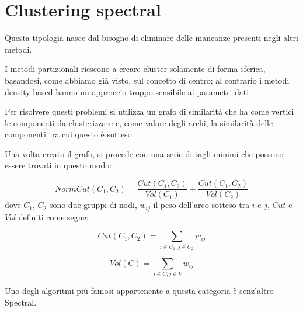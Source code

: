 \section{Clustering spectral}
	Questa tipologia nasce dal bisogno di eliminare delle mancanze presenti negli altri metodi. 

	I metodi partizionali riescono a creare cluster solamente di forma sferica, basandosi, come abbiamo già visto, sul concetto di centro; al contrario i metodi density-based hanno un approccio troppo sensibile ai parametri dati.

	Per risolvere questi problemi si utilizza un grafo di similarità che ha come vertici le componenti da clusterizzare e, come valore degli archi, la similarità delle componenti tra cui questo è sotteso.

	Una volta creato il grafo, si procede con una serie di tagli minimi che possono essere trovati in questo modo:

	\begin{equation*}
		NormCut(C_1, C_2) =  \frac{Cut(C_1, C_2)}{Vol(C_1)} + \frac{Cut(C_1, C_2)}{Vol(C_2)}
	\end{equation*}
	dove $C_1$, $C_2$ sono due gruppi di nodi,  $w_{ij}$ il peso dell'arco sotteso tra $i$ e $j$, $Cut$ e $Vol$ definiti come segue:

	\begin{equation*}
		Cut(C_1, C_2) = \sum_{i \in C_1, j \in C_2} {w_{ij}}
	\end{equation*}

	\begin{equation*}
		Vol(C) = \sum_{i \in C, j \in V} {w_{ij}}
	\end{equation*}

	Uno degli algoritmi più famosi appartenente a questa categoria è senz'altro Spectral.